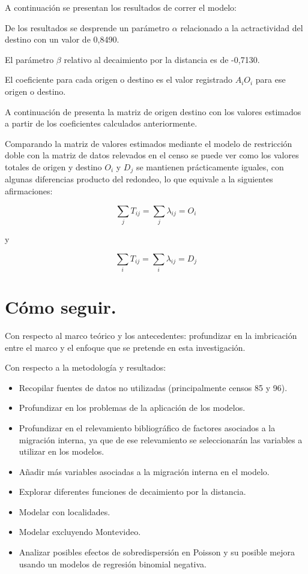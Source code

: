 \documentclass[12pt,spanish,]{article}
\providecommand{\tightlist}{%
  \setlength{\itemsep}{0pt}\setlength{\parskip}{0pt}}
\begin{document}
A continuación se presentan los resultados de correr el modelo:



De los resultados se desprende un parámetro \(\alpha\) relacionado a la
actractividad del destino con un valor de 0,8490.

El parámetro \(\beta\) relativo al decaimiento por la distancia es de
-0,7130.

El coeficiente para cada origen o destino es el valor registrado
\(A_{i}O_{i}\) para ese origen o destino.

A continuación de presenta la matriz de origen destino con los valores
estimados a partir de los coeficientes calculados anteriormente.

\newpage
\begin{landscape}

\end{landscape}

Comparando la matriz de valores estimados mediante el modelo de
restricción doble con la matriz de datos relevados en el censo se puede
ver como los valores totales de origen y destino \(O_{i}\) y \(D_{j}\)
se mantienen prácticamente iguales, con algunas diferencias producto del
redondeo, lo que equivale a la siguientes afirmaciones:

\[\sum_{j}T_{ij} = \sum_{j}\lambda_{ij} = O_{i}\]

y

\[\sum_{i}T_{ij} = \sum_{i}\lambda_{ij} = D_{j}\]

\newpage

\hypertarget{cuxf3mo-seguir.}{%
\section{Cómo seguir.}\label{cuxf3mo-seguir.}}

Con respecto al marco teórico y los antecedentes: profundizar en la
imbricación entre el marco y el enfoque que se pretende en esta
investigación.

Con respecto a la metodología y resultados:

\begin{itemize}
\tightlist
\item
  Recopilar fuentes de datos no utilizadas (principalmente censos 85 y
  96).
\item
  Profundizar en los problemas de la aplicación de los modelos.
\item
  Profundizar en el relevamiento bibliográfico de factores asociados a
  la migración interna, ya que de ese relevamiento se seleccionarán las
  variables a utilizar en los modelos.
\item
  Añadir más variables asociadas a la migración interna en el modelo.
\item
  Explorar diferentes funciones de decaimiento por la distancia.
\item
  Modelar con localidades.
\item
  Modelar excluyendo Montevideo.
\item
  Analizar posibles efectos de sobredispersión en Poisson y su posible
  mejora usando un modelos de regresión binomial negativa.
\end{itemize}
\end{document}
